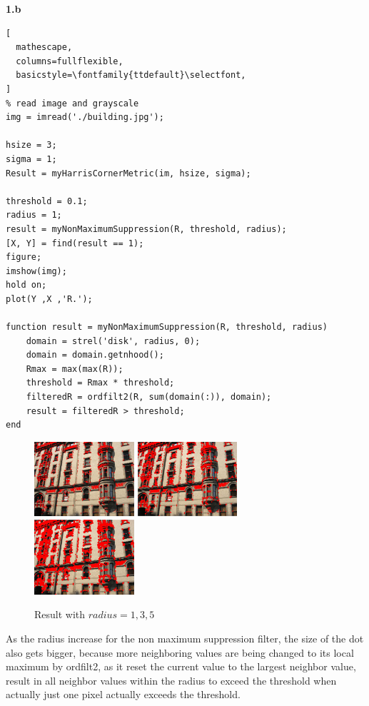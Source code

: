 \documentclass[11pt]{article}
\begin{document}
\newpage
\noindent
\textbf{1.b} \\
\begin{lstlisting}[
  mathescape,
  columns=fullflexible,
  basicstyle=\fontfamily{ttdefault}\selectfont,
]
% read image and grayscale
img = imread('./building.jpg');

hsize = 3;
sigma = 1;
Result = myHarrisCornerMetric(im, hsize, sigma);

threshold = 0.1;
radius = 1;
result = myNonMaximumSuppression(R, threshold, radius);
[X, Y] = find(result == 1);
figure;
imshow(img);
hold on;
plot(Y ,X ,'R.');

function result = myNonMaximumSuppression(R, threshold, radius) 
    domain = strel('disk', radius, 0);
    domain = domain.getnhood();
    Rmax = max(max(R));
    threshold = Rmax * threshold;
    filteredR = ordfilt2(R, sum(domain(:)), domain);
    result = filteredR > threshold;
end

\end{lstlisting}

\begin{figure}[h]
  \caption{Result with $ radius = 1, 3 ,5$}
    \includegraphics[width=0.33\textwidth]{1b1}
    \includegraphics[width=0.33\textwidth]{1b3}
    \includegraphics[width=0.33\textwidth]{1b5}
\end{figure}

\noindent
As the radius increase for the non maximum suppression filter, the size of the dot also gets bigger, because more neighboring values are being changed to its  local maximum by ordfilt2, as it reset the current value to the largest neighbor value, result in all neighbor values within the radius to exceed the threshold when actually just one pixel actually exceeds the threshold. \\
  
\end{document}
